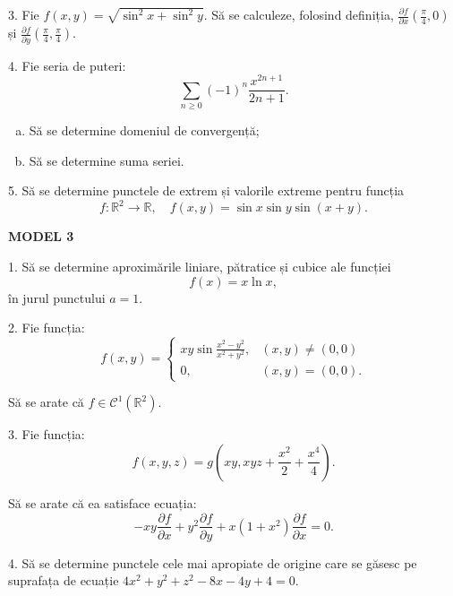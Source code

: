 \documentclass[11pt,a4paper]{article}
\newcommand\kal{\mathcal}
\newcommand\RR{\mathbb{R}}
\theoremstyle{dotless}
\theoremstyle{dotlessdr}
\begin{document}
\vspace{1cm}

3. Fie $f(x, y) = \sqrt{\sin^2 x + \sin^2 y}$. Să se calculeze, folosind definiția,
$\frac{\partial f}{\partial x} (\frac{\pi}{4}, 0)$ și
$\frac{\partial f}{\partial y} (\frac{\pi}{4}, \frac{\pi}{4})$.

\vspace{1cm}

4. Fie seria de puteri:
\[
  \sum_{n \geq 0} (-1)^n \frac{x^{2n+1}}{2n + 1}.
\]

\begin{enumerate}[(a)]
\item Să se determine domeniul de convergență;
\item Să se determine suma seriei.
\end{enumerate}

\vspace{1cm}

5. Să se determine punctele de extrem și valorile extreme pentru
funcția
\[
  f : \RR^2 \to \RR, \quad f(x, y) = \sin x \sin y \sin(x + y).
\]

\vspace{2cm}

\textbf{MODEL 3}

1. Să se determine aproximările liniare, pătratice și cubice ale funcției
\[
  f(x) = x \ln x,
\]
în jurul punctului $a = 1$.

\vspace{1cm}

2. Fie funcția:
\[
  f(x, y) = \begin{cases}
    xy \sin \frac{x^2 - y^2}{x^2 + y^2}, & (x, y) \neq (0, 0) \\
    0, & (x, y) = (0, 0).
  \end{cases}
\]

Să se arate că $f \in \kal{C}^1(\RR^2)$.

\vspace{1cm}

3. Fie funcția:
\[
  f(x, y, z) = g(xy, xyz + \frac{x^2}{2} + \frac{x^4}{4}).
\]

Să se arate că ea satisface ecuația:
\[
  -xy \frac{\partial f}{\partial x} + y^2 \frac{\partial f}{\partial y} +
  x(1 + x^2) \frac{\partial f}{\partial x} = 0.
\]

\vspace{1cm}

4. Să se determine punctele cele mai apropiate de origine care se găsesc pe suprafața
de ecuație $4x^2 + y^2 + z^2 - 8x - 4y + 4 = 0$.
\end{document}
